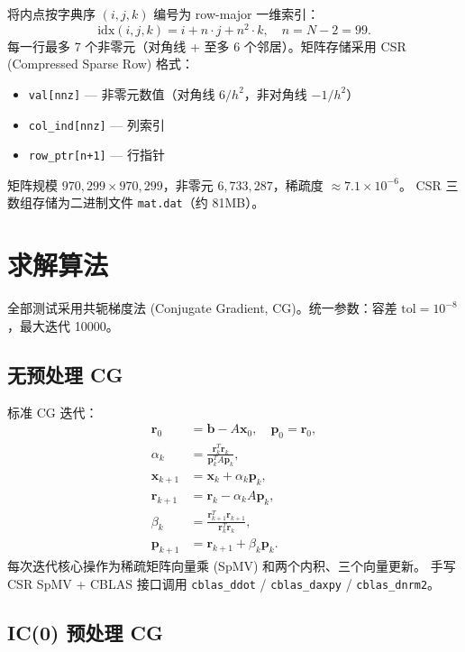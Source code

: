 \documentclass[12pt,a4paper]{ctexart}
\begin{document}
将内点按字典序 $(i,j,k)$ 编号为 row-major 一维索引：
\begin{equation}
\mathrm{idx}(i,j,k) = i + n\cdot j + n^2\cdot k, \quad n = N-2 = 99.
\end{equation}
每一行最多 7 个非零元（对角线 + 至多 6 个邻居）。矩阵存储采用 CSR (Compressed Sparse Row) 格式：
\begin{itemize}
\item \texttt{val[nnz]} — 非零元数值（对角线 $6/h^2$，非对角线 $-1/h^2$）
\item \texttt{col\_ind[nnz]} — 列索引
\item \texttt{row\_ptr[n+1]} — 行指针
\end{itemize}
矩阵规模 $970{,}299 \times 970{,}299$，非零元 $6{,}733{,}287$，稀疏度 $\approx 7.1\times10^{-6}$。
CSR 三数组存储为二进制文件 \texttt{mat.dat}（约 81MB）。

\section{求解算法}

全部测试采用共轭梯度法 (Conjugate Gradient, CG)。统一参数：容差 $\mathrm{tol}=10^{-8}$，最大迭代 10000。

\subsection{无预处理 CG}

标准 CG 迭代：
\begin{align}
\mathbf{r}_0 &= \mathbf{b} - A\mathbf{x}_0, \quad \mathbf{p}_0 = \mathbf{r}_0, \\
\alpha_k &= \frac{\mathbf{r}_k^T\mathbf{r}_k}{\mathbf{p}_k^T A\mathbf{p}_k}, \\
\mathbf{x}_{k+1} &= \mathbf{x}_k + \alpha_k \mathbf{p}_k, \\
\mathbf{r}_{k+1} &= \mathbf{r}_k - \alpha_k A\mathbf{p}_k, \\
\beta_k &= \frac{\mathbf{r}_{k+1}^T\mathbf{r}_{k+1}}{\mathbf{r}_k^T\mathbf{r}_k}, \\
\mathbf{p}_{k+1} &= \mathbf{r}_{k+1} + \beta_k \mathbf{p}_k.
\end{align}
每次迭代核心操作为稀疏矩阵向量乘 (SpMV) 和两个内积、三个向量更新。
手写 CSR SpMV + CBLAS 接口调用 \texttt{cblas\_ddot} / \texttt{cblas\_daxpy} / \texttt{cblas\_dnrm2}。

\subsection{IC(0) 预处理 CG}
\end{document}
